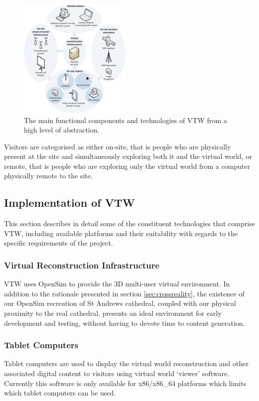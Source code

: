 \documentclass{sig-alternate}
\begin{document}
{\begin{figure}[]
\centering
\includegraphics[width=0.48\textwidth]{visio_diagram_2_tech.png}
\caption{The main functional components and technologies of VTW from a high level of abstraction.}
\label{vtwarchitecturediagram}
\end{figure}

Visitors are categorised as either on-site, that is people who are physically present at the site and simultaneously exploring both it and the virtual world, or remote, that is people who are exploring only the virtual world from a computer physically remote to the site.

\subsection{Implementation of VTW}
\label{subsec:architecturaldetailsofvtw}
This section describes in detail some of the constituent technologies that comprise VTW, including available platforms and their suitability with regards to the specific requirements of the project.

\subsubsection{Virtual Reconstruction Infrastructure}
VTW uses OpenSim to provide the 3D multi-user virtual environment. In addition to the rationale presented in section \ref{sec:crossreality}, the existence of our OpenSim recreation of St Andrews cathedral, coupled with our physical proximity to the real cathedral, presents an ideal environment for early development and testing, without having to devote time to content generation.

\subsubsection{Tablet Computers}
Tablet computers are used to display the virtual world reconstruction and other associated digital content to visitors using virtual world `viewer' software. Currently this software is only available for x86/x86\_64 platforms which limits which tablet computers can be used.

}
\end{document}
